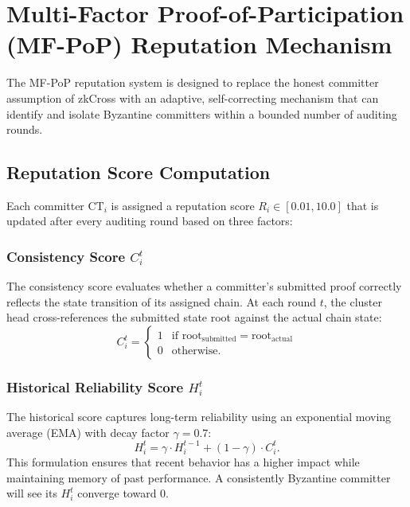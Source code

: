 \documentclass[journal]{IEEEtran}
\begin{document}
\section{Multi-Factor Proof-of-Participation (MF-PoP) Reputation Mechanism}

The MF-PoP reputation system is designed to replace the honest committer assumption of zkCross with an adaptive, self-correcting mechanism that can identify and isolate Byzantine committers within a bounded number of auditing rounds.

\subsection{Reputation Score Computation}

Each committer $\text{CT}_i$ is assigned a reputation score $R_i \in [0.01, 10.0]$ that is updated after every auditing round based on three factors:

\subsubsection{Consistency Score \texorpdfstring{$C_i^t$}{Cit}}
The consistency score evaluates whether a committer's submitted proof correctly reflects the state transition of its assigned chain. At each round $t$, the cluster head cross-references the submitted state root against the actual chain state:
\begin{equation}
C_i^t = \begin{cases} 1 & \text{if } \text{root}_{\text{submitted}} = \text{root}_{\text{actual}} \\ 0 & \text{otherwise.} \end{cases}
\label{eq:consistency}
\end{equation}

\subsubsection{Historical Reliability Score \texorpdfstring{$H_i^t$}{Hit}}
The historical score captures long-term reliability using an exponential moving average (EMA) with decay factor $\gamma = 0.7$:
\begin{equation}
H_i^t = \gamma \cdot H_i^{t-1} + (1 - \gamma) \cdot C_i^t.
\label{eq:history}
\end{equation}
This formulation ensures that recent behavior has a higher impact while maintaining memory of past performance. A consistently Byzantine committer will see its $H_i^t$ converge toward 0.
\end{document}
